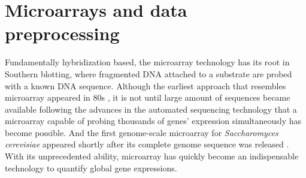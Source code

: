 %


%










\section{Microarrays and data preprocessing}

Fundamentally hybridization based, the microarray technology has its root in
Southern blotting, where fragmented DNA attached to a substrate are probed with
a known DNA sequence.
%
Although the earliest approach that resembles microarray appeared in
80s \cite{Augenlicht1982}, it is not until large amount of sequences
became available following the advances in the automated sequencing
technology that a microarray capable of probing thousands of genes'
expression simultaneously has become possible.
%
And the first genome-scale microarray for \textit{Saccharomyces
  cerevisiae} \cite{Davis1997} appeared shortly after its complete
genome sequence was released \cite{Goffeau1996}.
%
With its unprecedented ability, microarray has quickly become an
indispensable technology to quantify global gene expressions.


